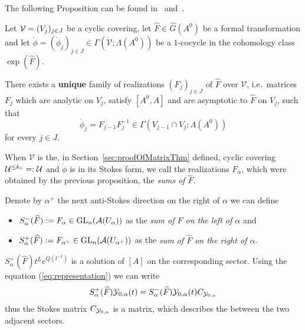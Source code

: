 The following Proposition can be found in~\cite[Prop.III.2.1]{Loday1994}
and~\cite[Thm.4.3.13]{Loday2014}.
\begin{prop}\label{prop:multisummability}
  Let $\mathcal{V}=(V_j)_{j\in J}$ be a cyclic covering, let $\hat F\in\hat G(A^0)$ be a
  formal transformation and let
  $\dot\phi=(\dot\phi_j)_{j\in J}\in\Gamma(\dot{\mathcal{V}};\Lambda(A^0))$ be a
  $1$-cocycle in the cohomology class $\exp(\hat F)$.

  There exists a \textbf{unique} family of realizations $(F_j)_{j\in J}$ of
  $\hat F$ over $\mathcal{V}$, i.e.\ matrices $F_j$ which are analytic on
  $V_j$, satisfy $[A^0,A]$ and are asymptotic to $\hat F$ on $V_j$, such that
  \[
    \dot\phi_j=F_{j-1}F_j^{-1} \in\Gamma(V_{j-1}\cap V_j;\Lambda(A^0))
  \]
  for every $j\in J$.
\end{prop}
When $\mathcal{V}$ is the, in Section~\ref{sec:proofOfMatrixThm} defined,
cyclic covering $\mathcal{U}^{\leq k_r}=:\mathcal{U}$ and $\dot\phi$ is in its Stokes
form\TODO[~(cf.~??)], we call the realizations $F_{\alpha}$, which were obtained
by the previous proposition, the \emph{sums of $\hat F$}.
\begin{defn}\label{defn:sumsLeftRight}
  Denote by $\alpha^+$ the next anti-Stokes direction on the right of $\alpha$
  we can define
  \begin{itemize}
  \item $S_\alpha^-(\widehat F):=F_\alpha\in\operatorname{GL}_n(\mathcal{A}(U_\alpha))$ as the \emph{sum
      of $\hat F$ on the left of $\alpha$} and
  \item $S_\alpha^+(\widehat F):=F_{\alpha^+}\in\operatorname{GL}_n(\mathcal{A}(U_{\alpha^+}))$ as the
    \emph{sum of $\hat F$ on the right of $\alpha$}.
  \end{itemize}
\end{defn}
\begin{rem}
  $S^+_\alpha(\hat F)t^Le^{Q(t^{-1})}$ is a solution of $[A]$ on the
  corresponding sector.
  Using the equation (\ref{eq:representation}) we can write
  \[
    S^+_\alpha(\widehat F)
    \mathcal{Y}_{0,\alpha}(t)
    =
    S^-_\alpha(\widehat F)
    \mathcal{Y}_{0,\alpha}(t)C_{\mathcal{Y}_{0,\alpha}}
  \]
  thus the Stokes matrix $C_{\mathcal{Y}_{0,\alpha}}$ is a matrix, which
  describes the  between the two adjacent sectors.
\end{rem}

